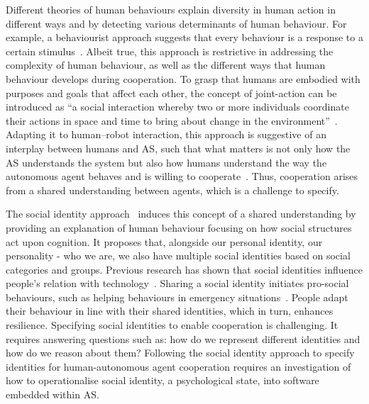 \documentclass[sigconf,nonacm]{acmart}%
\begin{document}
	Different theories of human behaviours explain diversity in human action in different ways and by detecting various determinants of human behaviour. For example, a behaviourist approach suggests that every behaviour is a response to a certain stimulus~\cite{heimlich2008understanding}. Albeit true, this approach is restrictive in addressing the complexity of human behaviour, as well as the different ways that human behaviour develops during cooperation. To grasp that humans are embodied with purposes and goals that affect each other, the concept of joint-action can be introduced as ``a social interaction whereby two or more individuals coordinate their actions in space and time to bring about change in the environment''~\cite{sebanz2006joint}. Adapting it to human–robot interaction, this approach is suggestive of an interplay between humans and AS, such that what matters is not only how the AS understands the system but also how humans understand the way the autonomous agent behaves and is willing to cooperate~\cite{grigore:2013}. Thus, cooperation arises from a shared understanding between agents, which is a challenge to specify. 
	
	The social identity approach~\cite{spears2021social} induces this concept of a shared understanding by providing an explanation of human behaviour focusing on how social structures act upon cognition. It proposes that, alongside our personal identity, our personality - who we are, we also have multiple social identities based on social categories and groups. 
	Previous research has shown that social identities influence people's relation with technology~\cite{lee2001effect}. Sharing a social identity initiates pro-social behaviours, such as helping behaviours in emergency situations~\cite{drury2018role}. People adapt their behaviour in line with their shared identities, which in turn, enhances resilience. Specifying social identities to enable cooperation is challenging. It requires answering questions such as: how do we represent different identities and how do we reason about them? Following the social identity approach to specify identities for human-autonomous agent cooperation requires an investigation of how to operationalise social identity, a psychological state, into software embedded within AS.
	
\end{document}

